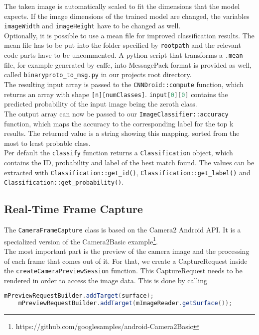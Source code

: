 The taken image is automatically scaled to fit the dimensions that the model expects. If the image dimensions of the trained model are changed, the variables \texttt{imageWidth} and \texttt{imageHeight} have to be changed as well.\\
Optionally, it is possible to use a mean file for improved classification results. The mean file has to be put into the folder specified by \texttt{rootpath} and the relevant code parts have to be uncommented. A python script that transforms a \texttt{.mean} file, for example generated by caffe, into MessagePack format is provided as well, called \texttt{binaryproto\_to\_msg.py} in our projects root directory.\\
The resulting input array is passed to the \texttt{CNNDroid::compute} function, which returns an array with shape \texttt{[n][numClasses]}. \lstinline[language=Java]{input[0][0]} contains the predicted probability of the input image being the zeroth class.\\
The output array can now be passed to our \texttt{ImageClassifier::accuracy} function, which maps the accuracy to the corresponding label for the top k results. The returned value is a string showing this mapping, sorted from the most to least probable class.\\
Per default the \texttt{classify} function returns a \texttt{Classification} object, which contains the ID, probability and label of the best match found. The values can be extracted with \texttt{Classification::get\_id()}, \texttt{Classification::get\_label()} and \texttt{Classification::get\_probability()}.

\subsection {Real-Time Frame Capture}
The \texttt{CameraFrameCapture} class is based on the Camera2 Android API. It is a specialized version of the Camera2Basic example\footnote{https://github.com/googlesamples/android-Camera2Basic}.\\
The most important part is the preview of the camera image and the processing of each frame that comes out of it. For that, we create a CaptureRequest inside the \texttt{createCameraPreviewSession} function. This CaptureRequest needs to be rendered in order to access the image data. This is done by calling
\begin{lstlisting}[language=Java, basicstyle=\scriptsize]
    mPreviewRequestBuilder.addTarget(surface);
    mPreviewRequestBuilder.addTarget(mImageReader.getSurface());
\end{lstlisting}

